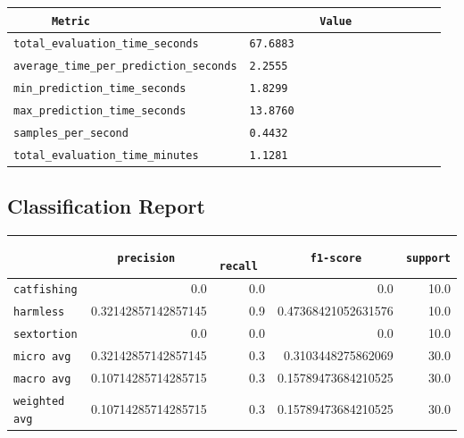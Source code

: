 \documentclass{article}
\begin{document}
\begin{center}
\begin{tabular}{l | l} \hline
    \verb|      Metric     | & \verb|           Value           | \\ \hline
    \hline
    \verb|total_evaluation_time_seconds| & \verb|67.6883                      | \\ \hline
    \verb|average_time_per_prediction_seconds| & \verb|2.2555                       | \\ \hline
    \verb|min_prediction_time_seconds| & \verb|1.8299                       | \\ \hline
    \verb|max_prediction_time_seconds| & \verb|13.8760                      | \\ \hline
    \verb|samples_per_second| & \verb|0.4432                       | \\ \hline
    \verb|total_evaluation_time_minutes| & \verb|1.1281                       | \\ \hline
\end{tabular}
\end{center}

\subsection{Classification Report}

\begin{center}
\begin{tabular}{l | r | r | r | r} \hline
    \verb|            | & \verb|    precision     | & \verb|      recall      | & \verb|     f1-score     | & \verb|support| \\ \hline
    \hline
    \verb|catfishing | & 0.0 & 0.0 & 0.0 &    10.0 \\ \hline
    \verb|harmless   | & 0.32142857142857145 & 0.9 & 0.47368421052631576 &    10.0 \\ \hline
    \verb|sextortion | & 0.0 & 0.0 & 0.0 &    10.0 \\ \hline
    \verb|micro avg  | & 0.32142857142857145 & 0.3 & 0.3103448275862069 &    30.0 \\ \hline
    \verb|macro avg  | & 0.10714285714285715 & 0.3 & 0.15789473684210525 &    30.0 \\ \hline
    \verb|weighted avg| & 0.10714285714285715 & 0.3 & 0.15789473684210525 &    30.0 \\ \hline
\end{tabular}
\end{center}
\end{document}
